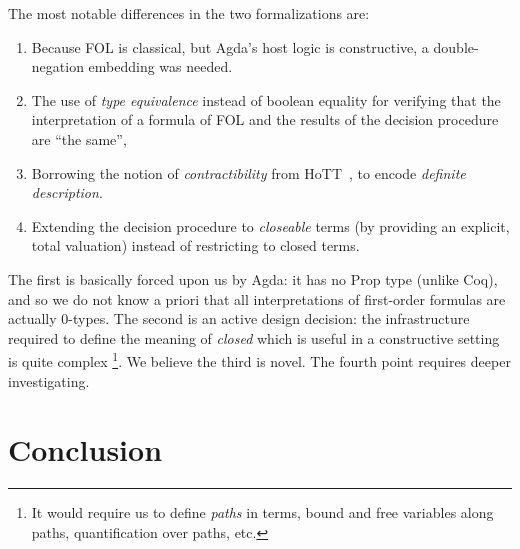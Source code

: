 \documentclass[fleqn]{llncs}
\begin{document}
The most notable differences in the two formalizations are:
\begin{enumerate}
\item Because FOL is classical, but Agda's host logic is constructive,
a double-negation embedding was needed.
\item The use of \emph{type equivalence} instead of boolean equality for
verifying that the interpretation of a formula of FOL and the results
of the decision procedure are ``the same'',
\item Borrowing the notion of \emph{contractibility} from 
HoTT~\cite{hottbook}, to encode \emph{definite description}.
\item Extending the decision procedure to \emph{closeable} terms (by
providing an explicit, total valuation) instead of restricting to
closed terms.
\end{enumerate}
The first is basically forced upon us by Agda: it has no Prop type (unlike
Coq), and so we do not know a priori that all interpretations of
first-order formulas are actually $0$-types.  The second is an active
design decision: the infrastructure required to define the meaning of
\emph{closed} which is useful in a constructive setting is quite complex%
\footnote{It would require us to define \emph{paths} in terms, bound and
free variables along paths, quantification over paths, etc.}.  We believe
the third is novel.  The fourth point requires deeper investigating.

\section{Conclusion}\label{sec:conclusion}

\iffalse
\begin{verbatim}
Outline:

  1. Both CTT_uqe and Agda can be used to formalize the biform theories
     involved in the network in Fig.1.

  2. CTT_uqe provides a built-in infrastructure for reasoning about
     syntax, but it is a nonstandard language with an unfamiliar
     semantics that has not been implemented.

  3. Agda is implemented, but by using the local approach,
     (1) the size of its infrastructure for
     reasoning about syntax depends on the size of the biform theory
     graph that is formalized and (2) it does not have an implemented
     notion of theory morphism (Is this true?).  This is not inherently
     a fault of Agda's.

  4. Recommendation: CTT_uqe is implemented, and then the test study
     is fully formalized in this implementation.

  5. Recommendation: implementing the global approach using Agda's
     reflection mechanism, to see how that compares to the global
     approach in CTT_uqe.

  6. To better understand the local approach, some automation to 
     derive languages related to each theory should be implemented.
\end{verbatim}
\fi
\end{document}
